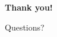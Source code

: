 \begin{frame}
    \centering
    \Huge \textbf{Thank you!}

    \vspace{1cm}
    \Large Questions?
\end{frame}